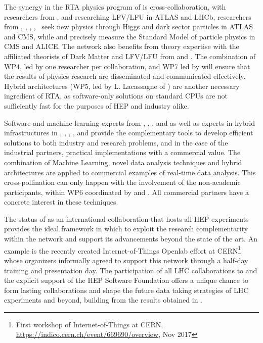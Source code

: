 The synergy in the RTA physics program of \acronym is cross-collaboration,
with researchers from \nikhefentity, \cnrsentity and
\dortmundentity researching LFV/LFU in ATLAS and LHCb,
researchers from \unigeentity, \cernentity, \helsinkientity, \heidelbergentity, \ seek new physics through 
Higgs and dark sector particles in ATLAS and CMS,
while \lundentity and \helsinkientity precisely measure the Standard Model of particle physics in CMS and ALICE. 
The network also benefits from theory expertise with the affiliated theorists of
Dark Matter and LFV/LFU from \ohioentity and \cincinnatientity. 
The combination of WP4, led by one researcher per collaboration, and WP7 led by \cernentity
will ensure that the results of physics research are disseminated and communicated effectively. 
Hybrid architectures (WP5, led by L. Lacassagne of \cnrsentity) are another necessary ingredient of RTA,
as software-only solutions on standard CPUs are not sufficiently fast for the purposes of HEP and industry alike. 

Software and machine-learning experts from \pointeightentity,
\ximantisentity, \heidelberginstrumentsentity, \yandexentity and \ibmentity
as well as  experts in hybrid infrastructures in \pisaentity, \cnrsentity, \fleetmaticsentity,
\lightboxentity, and \cathientity provide the complementary
tools to develop efficient solutions to both industry and research problems, and in the case of the
industrial partners, practical implementations with a commercial value. 
The combination of Machine Learning, novel data analysis techniques and hybrid architectures 
are applied to commercial examples of real-time data analysis. This cross-pollination can only happen with the 
involvement of the non-academic participants, within WP6 coordinated by \heidelbergentity and \dqentity. 
All commercial partners have a concrete interest in these techniques. 

The status of \cernentity as an international collaboration that
hosts all HEP experiments provides the ideal framework in which
to exploit the research complementarity within the network and support its 
advancements beyond the state of the art. An example is the recently created Internet-of-Things
Openlab effort at CERN\footnote{First workshop of Internet-of-Things at CERN, \url{https://indico.cern.ch/event/669690/overview}, Nov 2017}
whose organizers informally agreed to support this network through a half-day 
training and presentation day. 
The participation of all LHC collaborations to \acronym and the explicit support of the HEP Software Foundation offers a unique chance to form lasting collaborations and shape the future data taking strategies of LHC experiments and beyond, building from the  results obtained in \acronym.  

